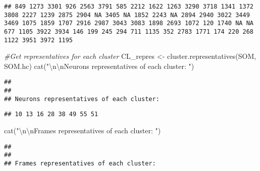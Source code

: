 \documentclass[
]{article}
\newenvironment{Shaded}{\begin{snugshade}}{\end{snugshade}}
\newcommand{\CommentTok}[1]{\textcolor[rgb]{0.56,0.35,0.01}{\textit{#1}}}
\newcommand{\FunctionTok}[1]{\textcolor[rgb]{0.00,0.00,0.00}{#1}}
\newcommand{\NormalTok}[1]{#1}
\newcommand{\OtherTok}[1]{\textcolor[rgb]{0.56,0.35,0.01}{#1}}
\newcommand{\SpecialCharTok}[1]{\textcolor[rgb]{0.00,0.00,0.00}{#1}}
\newcommand{\StringTok}[1]{\textcolor[rgb]{0.31,0.60,0.02}{#1}}
\begin{document}
\begin{verbatim}
## 849 1273 3301 926 2563 3791 585 2212 1622 1263 3290 3718 1341 1372 3808 2227 1239 2875 2904 NA 3405 NA 1852 2243 NA 2894 2940 3022 3449 3469 1075 1859 1707 2916 2987 3043 3083 1898 2693 1072 120 1740 NA NA 677 1105 3922 3934 146 199 245 294 711 1135 352 2783 1771 174 220 268 1122 3951 3972 1195
\end{verbatim}

\begin{Shaded}
\begin{Highlighting}[]
\CommentTok{\#Get representatives for each cluster}
\NormalTok{CL\_repres }\OtherTok{\textless{}{-}} \FunctionTok{cluster.representatives}\NormalTok{(SOM, SOM.hc)}
\FunctionTok{cat}\NormalTok{(}\StringTok{"}\SpecialCharTok{\textbackslash{}n\textbackslash{}n}\StringTok{Neurons representatives of each cluster: "}\NormalTok{)}
\end{Highlighting}
\end{Shaded}

\begin{verbatim}
## 
## 
## Neurons representatives of each cluster:
\end{verbatim}

\begin{Shaded}
\end{Shaded}

\begin{verbatim}
## 10 13 16 28 38 49 55 51
\end{verbatim}

\begin{Shaded}
\begin{Highlighting}[]
\FunctionTok{cat}\NormalTok{(}\StringTok{"}\SpecialCharTok{\textbackslash{}n\textbackslash{}n}\StringTok{Frames representatives of each cluster: "}\NormalTok{)}
\end{Highlighting}
\end{Shaded}

\begin{verbatim}
## 
## 
## Frames representatives of each cluster:
\end{verbatim}

\begin{Shaded}
\end{Shaded}
\end{document}
